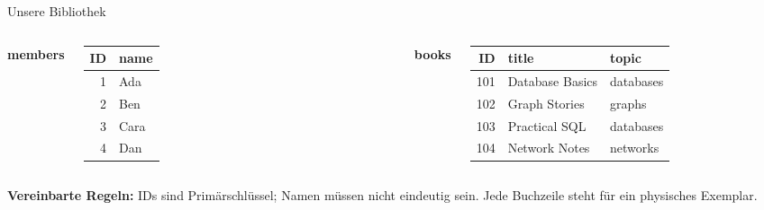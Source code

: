 \begin{frame}[t]{Unsere Bibliothek}

\begin{columns}[T,onlytextwidth]
\textbf{members}\par\smallskip
\small\begin{tabular}{rl}\toprule ID & name\\\midrule
1 & Ada\\2 & Ben\\3 & Cara\\4 & Dan\\\bottomrule\end{tabular}
\textbf{books}\par\smallskip
\small\begin{tabular}{rll}\toprule ID & title & topic\\\midrule
101 & Database Basics & databases\\102 & Graph Stories & graphs\\
103 & Practical SQL & databases\\104 & Network Notes & networks\\\bottomrule\end{tabular}
\end{columns}\vspace{5mm}
\textbf{Vereinbarte Regeln:} IDs sind Primärschlüssel; Namen müssen nicht eindeutig sein.
Jede Buchzeile steht für ein physisches Exemplar.

\end{frame}
